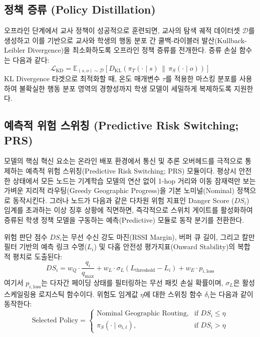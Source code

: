 \subsection{정책 증류 (Policy Distillation)}
오프라인 단계에서 교사 정책이 성공적으로 훈련되면, 교사의 탐색 궤적 데이터셋 $\mathcal{D}$를 생성하고 이를 기반으로 교사와 학생의 행동 분포 간 쿨백-라이블러 발산(Kullback-Leibler Divergence)을 최소화하도록 오프라인 정책 증류를 전개한다. 증류 손실 함수는 다음과 같다:
\[
\mathcal{L}_{\mathrm{KD}} = \mathbb{E}_{(s, o) \sim \mathcal{D}} \left[ D_{\mathrm{KL}} \left( \pi_T(\cdot \mid s) \,\|\, \pi_S(\cdot \mid o) \right) \right]
\]
KL Divergence 타겟으로 최적화할 때, 온도 매개변수 $\tau$를 적용한 마스킹 분포를 사용하여 불확실한 행동 분포 영역의 경향성까지 학생 모델이 세밀하게 복제하도록 지원한다.

\subsection{예측적 위험 스위칭 (Predictive Risk Switching; PRS)}
\method{} 모델의 핵심 혁신 요소는 온라인 배포 환경에서 통신 및 추론 오버헤드를 극적으로 통제하는 예측적 위험 스위칭(Predictive Risk Switching; PRS) 모듈이다. 평상시 안전한 상태에서 모든 노드는 기계학습 모델의 연산 없이 1-hop 거리와 이동 잠재력만 보는 가벼운 지리적 라우팅(Greedy Geographic Progress)을 기본 노미널(Nominal) 정책으로 동작시킨다. 
그러나 노드가 다음과 같은 다차원 위험 지표인 Danger Score ($DS_i$) 임계를 초과하는 이상 징후 상황에 직면하면, 즉각적으로 스위치 게이트를 활성화하여 증류된 학생 정책 모델을 구동하는 예측(Predictive) 모듈로 동작 분기를 전환한다.

위험 판단 점수 $DS_i$는 무선 수신 강도 마진(RSSI Margin), 버퍼 큐 길이, 그리고 칼만 필터 기반의 예측 링크 수명($L_i$) 및 다홉 안전성 평가지표(Onward Stability)의 복합적 평치로 도출된다:
\[
DS_i = w_Q \cdot \frac{q_i}{q_{\mathrm{max}}} + w_L \cdot \sigma_L(L_{\mathrm{threshold}} - L_i) + w_E \cdot p_{i,\mathrm{loss}}
\]
여기서 $p_{i,\mathrm{loss}}$는 다자간 페이딩 상태를 필터링하는 무선 패킷 손실 확률이며, $\sigma_L$은 활성 스케일링용 로지스틱 함수이다. 
위험도 임계값 $\eta$에 대한 스위칭 함수 $\delta_i$는 다음과 같이 동작한다:
\[
\text{Selected Policy} = \begin{cases} 
\text{Nominal Geographic Routing}, & \text{if } DS_i \le \eta \\ 
\pi_S(\cdot \mid o_{i,t}), & \text{if } DS_i > \eta 
\end{cases}
\]

